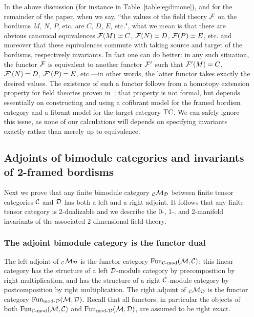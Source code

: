 \documentclass{amsart}
\begin{document}
\begin{remark} \label{rem:hep}
In the above discussion (for instance in Table~\ref{table:egdimone}), and for the remainder of the paper, when we say, ``the values of the field theory $\mathcal F$ on the bordisms $M$, $N$, $P$, etc. are $C$, $D$, $E$, etc.", what we mean is that there are obvious canonical equivalences $\mathcal F(M) \simeq C$, $\mathcal F(N) \simeq D$, $\mathcal F(P) \simeq E$, etc. and moreover that these equivalences commute with taking source and target of the bordisms, respectively invariants.  In fact one can do better: in any such situation, the functor $\mathcal F$ is equivalent to another functor $\mathcal F'$ such that $\mathcal F'(M) = C$, $\mathcal F'(N) = D$, $\mathcal F'(P) = E$, etc.---in other words, the latter functor takes exactly the desired values.  The existence of such a functor follows from a homotopy extension property for field theories proven in~\cite{3TC}; that property is not formal, but depends essentially on constructing and using a cofibrant model for the framed bordism category and a fibrant model for the target category $\mathrm{TC}$.  We can safely ignore this issue, as none of our calculations will depends on specifying invariants exactly rather than merely up to equivalence.
\end{remark}


\subsection{Adjoints of bimodule categories and invariants of 2-framed bordisms}   \label{sec:df-morphisms}


Next we prove that any finite bimodule category ${}_\mathcal C \mathcal M_\mathcal D$ between finite tensor categories $\mathcal C$ and $\mathcal D$ has both a left and a right adjoint.  It follows that any finite tensor category is 2-dualizable and we describe the 0-, 1-, and 2-manifold invariants of the associated 2-dimensional field theory.

\subsubsection{The adjoint bimodule category is the functor dual} \label{sec:df-modules}

The left adjoint of ${}_\mathcal C \mathcal M_\mathcal D$ is the functor category $\Fun_{\mod{\cC}{}}(\cM,\cC)$; this linear category has the structure of a left $\mathcal D$-module category by precomposition by right multiplication, and has the structure of a right $\mathcal C$-module category by postcomposition by right multiplication.  The right adjoint of ${}_\mathcal C \mathcal M_\mathcal D$ is the functor category $\Fun_{\mod{}{\cD}}(\cM,\cD)$.  Recall that all functors, in particular the objects of both $\Fun_{\mod{\cC}{}}(\cM,\cC)$ and $\Fun_{\mod{}{\cD}}(\cM,\cD)$, are assumed to be right exact.
\end{document}
